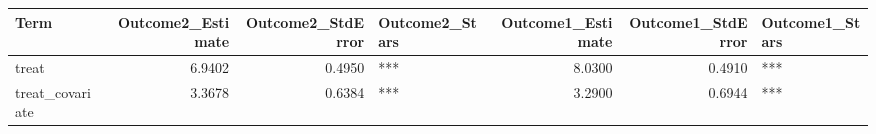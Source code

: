 \begin{table}[ht]
\centering
\begin{tabular}{lrrlrrl}
  \hline
Term & Outcome2_Estimate & Outcome2_StdError & Outcome2_Stars & Outcome1_Estimate & Outcome1_StdError & Outcome1_Stars \\ 
  \hline
treat & 6.9402 & 0.4950 & *** & 8.0300 & 0.4910 & *** \\ 
  treat_covariate & 3.3678 & 0.6384 & *** & 3.2900 & 0.6944 & *** \\ 
   \hline
\end{tabular}
\end{table}
